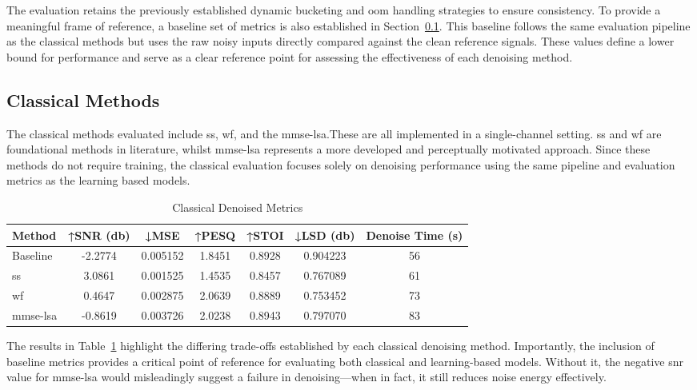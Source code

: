 The evaluation retains the previously established dynamic bucketing and \gls{oom} handling strategies to ensure consistency. To provide a meaningful frame of reference, a baseline set of metrics is also established in Section~\ref{sec:classical_methods}. This baseline follows the same evaluation pipeline as the classical methods but uses the raw noisy inputs directly compared against the clean reference signals. These values define a lower bound for performance and serve as a clear reference point for assessing the effectiveness of each denoising method.

\subsection{Classical Methods}
\label{sec:classical_methods}

The classical methods evaluated include \gls{ss}, \gls{wf}, and the \gls{mmse-lsa}.These are all implemented in a single-channel setting. \gls{ss} and \gls{wf} are foundational methods in literature, whilst \gls{mmse-lsa} represents a more developed and perceptually motivated approach. Since these methods do not require training, the classical evaluation focuses solely on denoising performance using the same pipeline and evaluation metrics as the learning based models.

\vspace{1em}
\begin{table}[H]
\centering
\caption{Classical Denoised Metrics}
\label{tab:classical_metrics}
\begin{tabular}{|l|c|c|c|c|c|c|}
\hline
\textbf{Method} & \textbf{↑SNR (db)} & \textbf{↓MSE} & \textbf{↑PESQ} & \textbf{↑STOI} & \textbf{↓LSD (db)} & \textbf{Denoise Time (s)} \\
\hline
Baseline     & -2.2774 & 0.005152 & 1.8451 & 0.8928 & 0.904223 & 56 \\
\gls{ss}          & 3.0861 & 0.001525 & 1.4535 & 0.8457 & 0.767089 & 61 \\
\gls{wf}          & 0.4647 & 0.002875 & 2.0639 & 0.8889 & 0.753452 & 73 \\
\gls{mmse-lsa}    & -0.8619 & 0.003726 & 2.0238 & 0.8943 & 0.797070 & 83 \\
\hline
\end{tabular}
\end{table}

The results in Table~\ref{tab:classical_metrics} highlight the differing trade-offs established by each classical denoising method. Importantly, the inclusion of baseline metrics provides a critical point of reference for evaluating both classical and learning-based models. Without it, the negative \gls{snr} value for \gls{mmse-lsa} would misleadingly suggest a failure in denoising—when in fact, it still reduces noise energy effectively.

